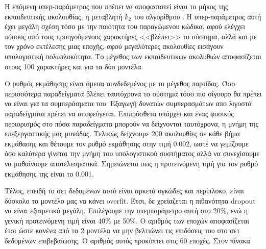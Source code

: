 Η επόμενη υπερ-παράμετρος που πρέπει να αποφασιστεί είναι το μήκος της εκπαιδευτικής ακολουθίας, η μεταβλητή $k_2$ του αλγορίθμου . Η υπερ-παράμετρος αυτή έχει μεγάλη σχέση τόσο με την ποιότητα του παραγώμενου κώδικα, αφού ελέγχει πόσους από τους προηγούμενους χαρακτήρες <<βλέπει>> το σύστημα, αλλά και με τον χρόνο εκτέλεσης μιας εποχής, αφού μεγαλύτερες ακολουθίες εισάγουν υπολογιστική πολυπλοκότητα. Το μέγεθος των εκπαιδευτικων ακολυθιών αποφασίζεται στους 100 χαρακτήρες και για τα δύο μοντέλα.

Ο ρυθμός εκμάθησης είναι άμεσα συνδεδεμένος με το μέγεθος παρτίδας. Όσο περισσότερα παραδείγματα βλέπει ταυτόχρονα το σύστημα τόσο πιο σίγουρο θα πρέπει να είναι για τα συμπεράσματα του. Εξαγωγή δυνατών συμπερασμάτων απο λιγοστά παραδείγματα πρέπει να αποφεύγεται. Επιπρόσθετα υπάρχει και ένας φυσικός περιορισμός στο πόσα παραδείγματα μπορούν να δείχνονται ταυτόχρονα, η μνήμη της επεξεργαστικής μας μονάδας. Τελικώς δείχνουμε 200 ακολουθίες σε κάθε βήμα εκμάθασης και θέτουμε τον ρυθμό εκμάθησης στην τιμή 0.002, ωστέ να γεμίζουμε όσο καλύτερα γίνεται την μνήμη του υπολογιστικού συστήματος αλλά να συνεχίσουμε να μαθαίνουμε αποτελεσματικά. Σημειώνεται πως η προτεινόμενη τιμή για τον ρυθμό εκμάθησης της  είναι το 0.001.

Τέλος, επειδή το σετ δεδομένων αυτό είναι αρκετά ογκώδες και περίπλοκο, είναι δύσκολο το μοντέλο μας να κάνει overfit. Έτσι, δε χρείαζεται η πιθανότητα dropout να είναι εξαιρετικά μεγάλη. Επιλέγουμε την υπερπαράμετρο αυτή στο 20\%, ενώ η γενική προτεινόμενη τιμή είναι 40\% με 50\%. Ο αριθμός των εποχών αποφασίζεται έτσι ώστε κανένα από τα 2 μοντέλα να μην βελτιώνει τις επιδόσεις του στο σετ δεδομένων επιβεβαίωσης. Ο αριθμός αυτός προκύπτει στις 60 εποχές. Στον πίνακα %

   

\section{}

